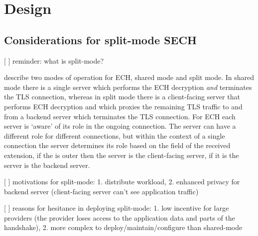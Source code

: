 \chapter{Design}
\label{chap:Design}

\section{Considerations for split-mode SECH}
[ ] reminder: what is split-mode?

\cite{esni} describe two modes of operation for ECH, shared mode and split mode. In shared mode there is a single server which performs the ECH decryption {\em and} terminates the TLS connection, whereas in split mode there is a client-facing server that performs ECH decryption and which proxies the remaining TLS traffic to and from a backend server which terminates the TLS connection. For ECH each server is `aware' of its role in the ongoing connection. The server can have a different role for different connections, but within the context of a single connection the server determines its role based on the  field of the received  extension, if the  is outer then the server is the client-facing server, if it is  the server is the backend server.

[ ] motivations for split-mode: 1. distribute workload, 2. enhanced privacy for backend server (client-facing server can't see application traffic)

[ ] reasons for hesitance in deploying split-mode: 1. low incentive for large providers (the provider loses access to the application data and parts of the handshake), 2. more complex to deploy/maintain/configure than shared-mode 



